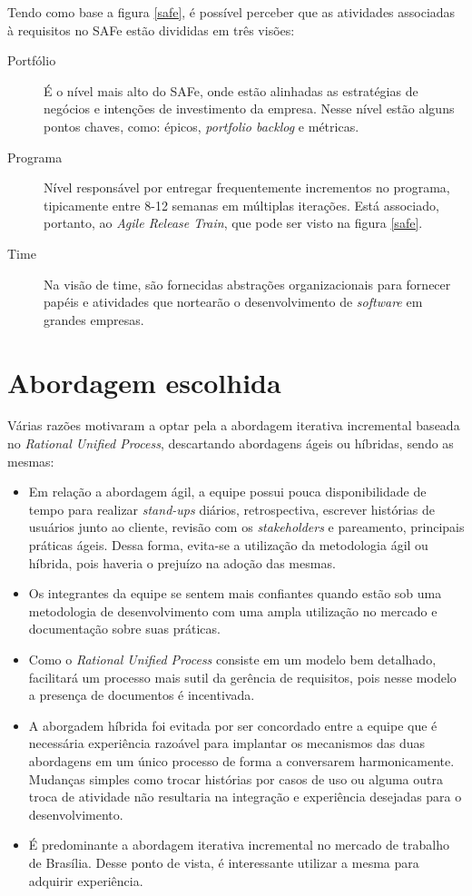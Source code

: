 Tendo como base a figura \ref{safe}, é possível perceber que as atividades associadas à requisitos no SAFe estão divididas em três visões:
\begin{description}
\item [Portfólio] É o nível mais alto do SAFe, onde estão alinhadas as estratégias de negócios e intenções de investimento da empresa. Nesse nível estão alguns pontos chaves, como: épicos, \textit{portfolio backlog} e métricas.~\cite{portfolio}
\item [Programa] Nível responsável por entregar frequentemente incrementos no programa, tipicamente entre 8-12 semanas em múltiplas iterações. Está associado, portanto, ao \textit{Agile Release Train}, que pode ser visto na figura \ref{safe}.~\cite{program}
\item [Time] Na visão de time, são fornecidas abstrações organizacionais para fornecer papéis e atividades que nortearão o desenvolvimento de \textit{software} em grandes empresas.~\cite{team}
\end{description}

\section{Abordagem escolhida}

Várias razões motivaram a optar pela a abordagem iterativa incremental baseada no \textit{Rational Unified Process}, descartando abordagens ágeis ou híbridas, sendo as mesmas:
\begin{itemize}
\item Em relação a abordagem ágil, a equipe possui pouca disponibilidade de tempo para realizar \textit{stand-ups} diários, retrospectiva, escrever histórias de usuários junto ao cliente, revisão com os \textit{stakeholders} e pareamento, principais práticas ágeis. Dessa forma, evita-se a utilização da metodologia ágil ou híbrida, pois haveria o prejuízo na adoção das mesmas.
\item Os integrantes da equipe se sentem mais confiantes quando estão sob uma metodologia de desenvolvimento com uma ampla utilização no mercado e documentação sobre suas práticas.
\item Como o \textit{Rational Unified Process} consiste em um modelo bem detalhado, facilitará um processo mais sutil da gerência de requisitos, pois nesse modelo a presença de documentos é incentivada.
\item A aborgadem híbrida foi evitada por ser concordado entre a equipe que é necessária experiência razoável para implantar os mecanismos das duas abordagens em um único processo de forma a conversarem harmonicamente. Mudanças simples como trocar histórias por casos de uso ou alguma outra troca de atividade não resultaria na integração e experiência desejadas para o desenvolvimento.
\item É predominante a abordagem iterativa incremental no mercado de trabalho de Brasília. Desse ponto de vista, é interessante utilizar a mesma para adquirir experiência.
\end{itemize}








